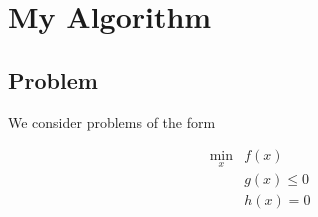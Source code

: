 \documentclass{article} %
\begin{document}
%
%










\section{My Algorithm}

\subsection{Problem}

We consider problems of the form

\begin{align*} 
\min_x & f(x) \\
 & g(x) \le 0 \\
 & h(x) = 0
\end{align*}
\end{document}
